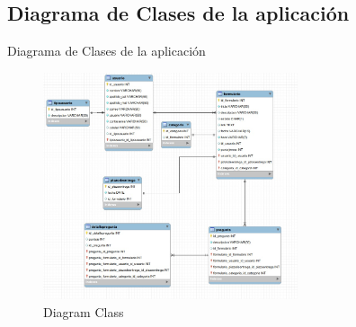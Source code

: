 \documentclass[twoside,twocolumn]{article}
\begin{document}
\subsection{Diagrama de Clases de la aplicación}
Diagrama de Clases de la aplicación
\begin{figure}[h!]
	\begin{center}
		\includegraphics[width=7.5cm]{./Imagenes/diagramclass} 
		\caption{Diagram Class}
	\end{center}
\end{figure}
\end{document}
